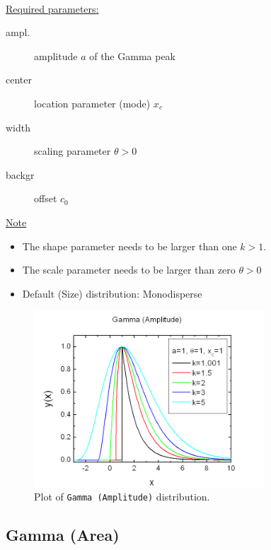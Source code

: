 ~\\

\underline{Required parameters:}
\begin{description}
    \item[ampl.] amplitude $a$ of the Gamma peak
    \item[center] location parameter (mode) $x_c$
    \item[width] scaling parameter $\theta>0$
    \item[backgr] offset $c_0$
\end{description}

\underline{Note}
\begin{itemize}
  \item The shape parameter needs to be larger than one $k>1$.
  \item The scale parameter needs to be larger than zero $\theta>0$
  \item Default (Size) distribution: Monodisperse
\end{itemize}

\begin{figure}[htb]
\begin{center}
\includegraphics[width=0.768\textwidth]{GammaAmplitude.png}
\end{center}
\caption{Plot of \texttt{Gamma (Amplitude)} distribution.}
\label{fig:GammaAmplitude}
\end{figure}

\vspace{5mm}

\subsection{Gamma (Area)} ~\\
\label{sec:GammaDistrArea}


